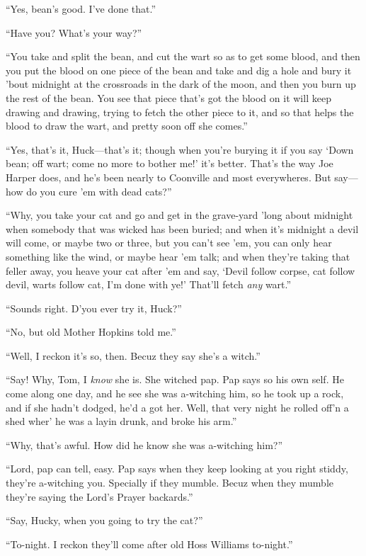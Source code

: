 \documentclass{book}
\begin{document}
“Yes, bean’s good. I’ve done that.”

“Have you? What’s your way?”

“You take and split the bean, and cut the wart so as to get some blood, and then you put the blood on one piece of the bean and take and dig a hole and bury it ’bout midnight at the crossroads in the dark of the moon, and then you burn up the rest of the bean. You see that piece that’s got the blood on it will keep drawing and drawing, trying to fetch the other piece to it, and so that helps the blood to draw the wart, and pretty soon off she comes.”

“Yes, that’s it, Huck—that’s it; though when you’re burying it if you say ‘Down bean; off wart; come no more to bother me!’ it’s better. That’s the way Joe Harper does, and he’s been nearly to Coonville and most everywheres. But say—how do you cure ’em with dead cats?”

“Why, you take your cat and go and get in the grave-yard ’long about midnight when somebody that was wicked has been buried; and when it’s midnight a devil will come, or maybe two or three, but you can’t see ’em, you can only hear something like the wind, or maybe hear ’em talk; and when they’re taking that feller away, you heave your cat after ’em and say, ‘Devil follow corpse, cat follow devil, warts follow cat, I’m done with ye!’ That’ll fetch \emph{any} wart.”

“Sounds right. D’you ever try it, Huck?”

“No, but old Mother Hopkins told me.”

“Well, I reckon it’s so, then. Becuz they say she’s a witch.”

“Say! Why, Tom, I \emph{know} she is. She witched pap. Pap says so his own self. He come along one day, and he see she was a-witching him, so he took up a rock, and if she hadn’t dodged, he’d a got her. Well, that very night he rolled off’n a shed wher’ he was a layin drunk, and broke his arm.”

“Why, that’s awful. How did he know she was a-witching him?”

“Lord, pap can tell, easy. Pap says when they keep looking at you right stiddy, they’re a-witching you. Specially if they mumble. Becuz when they mumble they’re saying the Lord’s Prayer backards.”

“Say, Hucky, when you going to try the cat?”

“To-night. I reckon they’ll come after old Hoss Williams to-night.”
\end{document}
